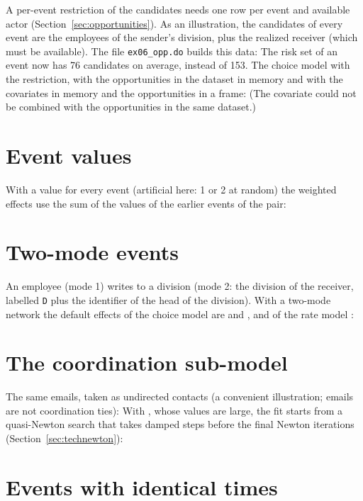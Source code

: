 A per-event restriction of the candidates needs one row per event and available actor (Section~\ref{sec:opportunities}). As an illustration, the candidates of every event are the employees of the sender's division, plus the realized receiver (which must be available). The file \texttt{ex06\_opp.do} builds this data:
The risk set of an event now has 76 candidates on average, instead of 153. The choice model with the restriction, with the opportunities in the dataset in memory and with the covariates in memory and the opportunities in a frame:
(The covariate  could not be combined with the opportunities in the same dataset.)

\section{Event values}

With a value for every event (artificial here: 1 or 2 at random) the weighted effects use the sum of the values of the earlier events of the pair:

\section{Two-mode events}\label{sec:ex_twomode}

An employee (mode 1) writes to a division (mode 2: the division of the receiver, labelled \texttt{D} plus the identifier of the head of the division). With a two-mode network the default effects of the choice model are  and , and of the rate model :

\section{The coordination sub-model}\label{sec:ex_coord}

The same emails, taken as undirected contacts (a convenient illustration; emails are not coordination ties):
With , whose values are large, the fit starts from a quasi-Newton search that takes damped steps before the final Newton iterations (Section~\ref{sec:technewton}):

\section{Events with identical times}\label{sec:ex_ties}

